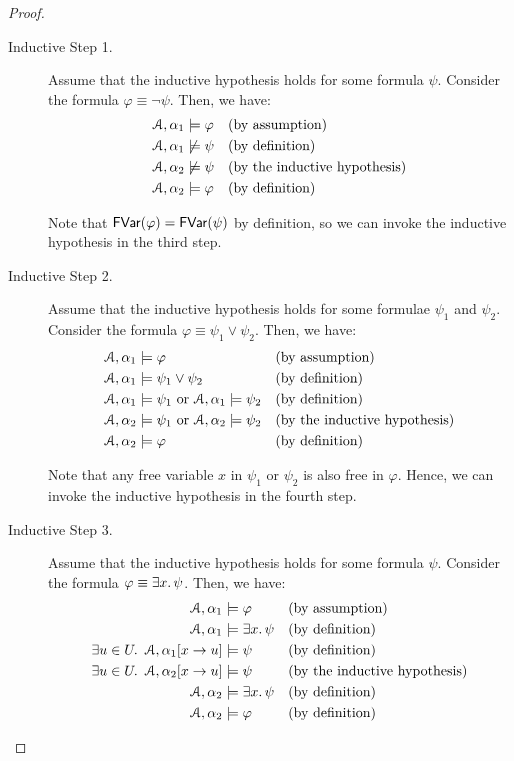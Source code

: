 \documentclass[11pt,usenames, dvipsnames]{article}
\begin{document}
\begin{proof}
\begin{description}
    \item[Inductive Step 1.] Assume that the inductive hypothesis holds for some formula $\psi$. Consider the formula $\varphi \equiv \neg \psi$. Then, we have:
    \begin{align*}
      \struct, \alpha_1 &\models \varphi &&\text{(by assumption)}
      \\
      \struct, \alpha_1 &\not\models \psi &&\text{(by definition)}
      \\
      \struct, \alpha_2 &\not\models \psi &&\text{(by the inductive hypothesis)}
      \\
      \struct, \alpha_2 &\models \varphi &&\text{(by definition)}
    \end{align*}

    Note that $\mathsf{FVar}(\varphi) = \mathsf{FVar}(\psi)$ by definition, so we can invoke the inductive hypothesis in the third step.

    \item[Inductive Step 2.] Assume that the inductive hypothesis holds for some formulae $\psi_1$ and $\psi_2$. Consider the formula $\varphi \equiv \psi_1 \lor \psi_2$. Then, we have:
    \begin{align*}
      \struct, \alpha_1 &\models \varphi &&\text{(by assumption)}
      \\
      \struct, \alpha_1 &\models \psi_1 \lor \psi_2 &&\text{(by definition)}
      \\
      \struct, \alpha_1 &\models \psi_1 \text{ or } \struct, \alpha_1 \models \psi_2 &&\text{(by definition)}
      \\
      \struct, \alpha_2 &\models \psi_1 \text{ or } \struct, \alpha_2 \models \psi_2 &&\text{(by the inductive hypothesis)}
      \\
      \struct, \alpha_2 &\models \varphi &&\text{(by definition)}
    \end{align*}

    Note that any free variable $x$ in $\psi_1$ or $\psi_2$ is also free in $\varphi$. Hence, we can invoke the inductive hypothesis in the fourth step.

    \item[Inductive Step 3.] Assume that the inductive hypothesis holds for some formula $\psi$. Consider the formula $\varphi \equiv \exists x \ldotp \psi$. Then, we have:
    \begin{align*}
      \struct, \alpha_1 &\models \varphi &&\text{(by assumption)}
      \\
      \struct, \alpha_1 &\models \exists x \ldotp \psi &&\text{(by definition)}
      \\
      \exists u \in U \ldotp \ \struct, \alpha_1[x \to u] &\models \psi &&\text{(by definition)}
      \\
      \exists u \in U \ldotp \ \struct, \alpha_2[x \to u] &\models \psi &&\text{(by the inductive hypothesis)}
      \\
      \struct, \alpha_2 &\models \exists x \ldotp \psi &&\text{(by definition)}
      \\
      \struct, \alpha_2 &\models \varphi &&\text{(by definition)}
    \end{align*}


\end{description}
\end{proof}
\end{document}
